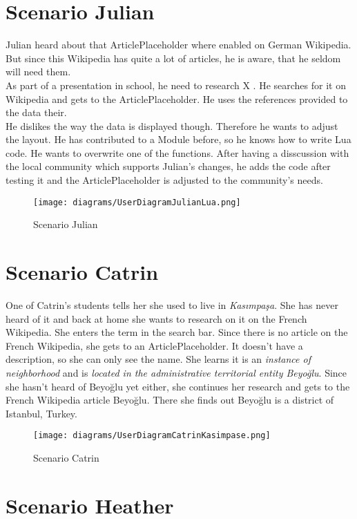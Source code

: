 \section{Scenario Julian}
Julian heard about that ArticlePlaceholder where enabled on German Wikipedia. But since this Wikipedia has quite a lot of articles, he is aware, that he seldom will need them. \\
As part of a presentation in school, he need to research X . He searches for it on Wikipedia and gets to the ArticlePlaceholder. He uses the references provided to the data their. \\
He dislikes the way the data is displayed though. Therefore he wants to adjust the layout. He has contributed to a Module before, so he knows how to write Lua code. He wants to overwrite one of the functions. After having a disscussion with the local community which supports Julian's changes, he adds the code after testing it and the ArticlePlaceholder is adjusted to the community's needs. 
\begin{figure}[H]
	\centering
	\texttt{[image: diagrams/UserDiagramJulianLua.png]}
	\caption{Scenario Julian}
	\label{fig:ScenarioJulian}
\end{figure}

\section{Scenario Catrin}
One of Catrin's students tells her she used to live in \textit{Kasımpaşa}. She has never heard of it and back at home she wants to research on it on the French Wikipedia. She enters the term in the search bar. Since there is no article on the French Wikipedia, she gets to an ArticlePlaceholder. It doesn't have a description, so she can only see the name. She learns it is an \textit{instance of neighborhood} and is \textit{located in the administrative territorial entity Beyoğlu}. Since she hasn't heard of Beyoğlu yet either, she continues her research and gets to the French Wikipedia article Beyoğlu. There she finds out Beyoğlu is a district of Istanbul, Turkey.
\begin{figure}[H]
	\centering
	\texttt{[image: diagrams/UserDiagramCatrinKasimpase.png]}
	\caption{Scenario Catrin}
	\label{fig:ScenarioCartin}
\end{figure}

\section{Scenario Heather}

